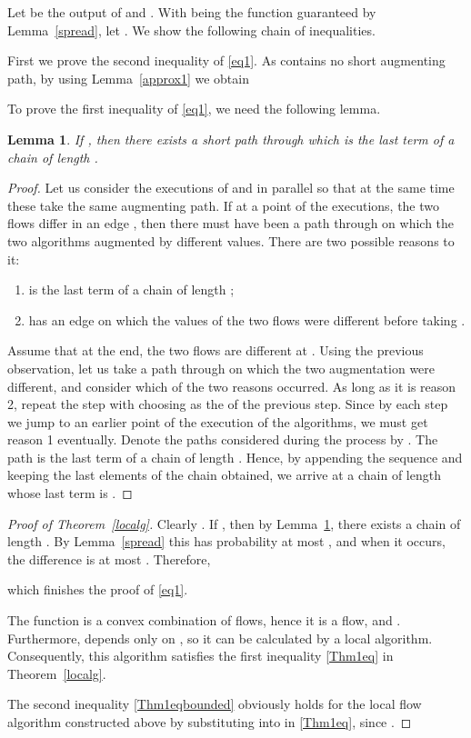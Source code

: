 \documentclass[12pt,a4paper]{article}
\newtheorem{Lemma}[Theorem]{Lemma}
\renewcommand{\:}{\colon}
\begin{document}
Let  be the output of  and . 
With  being the function guaranteed by Lemma~\ref{spread}, let . 
We show the following chain of inequalities. 


First we prove the second inequality of \eqref{eq1}.
As  contains no short augmenting path, by using Lemma~\ref{approx1} we obtain


To prove the first inequality of \eqref{eq1}, we need the following lemma.

\begin{Lemma} \label{diff}
If , then there exists a short path through  which is the last term of a chain of length .
\end{Lemma}

\begin{proof}
Let us consider the executions of  and  in parallel so that at the same time these take the same augmenting path.
If at a point of the executions, the two flows differ in an edge , then there must have been a path  through  on which the two algorithms augmented by different values. 
There are two possible reasons to it:
\begin{enumerate}
\item  is the last term of a chain of length ;
\item  has an edge  on which the values of the two flows were different before taking .
\end{enumerate}
Assume that at the end, the two flows are different at . 
Using the previous observation, let us take a path  through  on which the two augmentation were different, and consider which of the two reasons occurred. 
As long as it is reason 2, repeat the step with choosing  as the  of the previous step. 
Since by each step we jump to an earlier point of the execution of the algorithms, we must get reason 1 eventually. 
Denote the paths considered during the process by . 
The path  is the last term of a chain of length . 
Hence, by appending the sequence  and keeping the last  elements of the chain obtained, we arrive at a chain of length  whose last term is .
\end{proof}

\begin{proof}[Proof of Theorem~\ref{localg}]
Clearly . 
If , then by Lemma~\ref{diff}, there exists a chain of length . 
By Lemma~\ref{spread} this has probability at most , and when it occurs, the difference  is at most . Therefore,



which finishes the proof of \eqref{eq1}.

The function  is a convex combination of flows, hence it is a flow, and . 
Furthermore,  depends only on , so it can be calculated by a local algorithm. Consequently, this algorithm satisfies the first inequality \eqref{Thm1eq} in Theorem~\ref{localg}. 

The second inequality \eqref{Thm1eqbounded} obviously holds for the local flow algorithm constructed above by substituting  into  in \eqref{Thm1eq}, since .
\end{proof}
\end{document}
